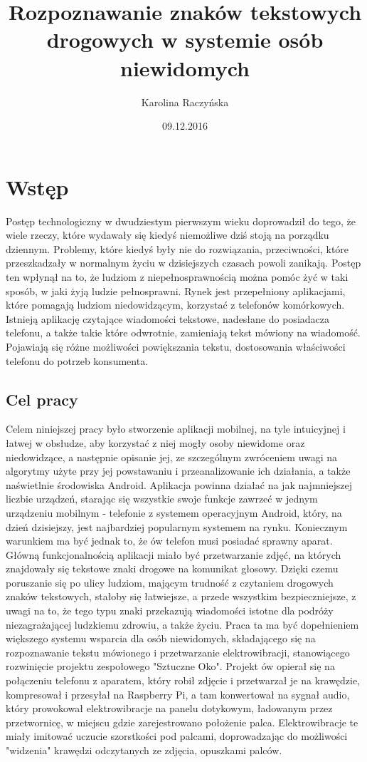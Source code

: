 \documentclass[eng,oneside]{mgr}
\title{Rozpoznawanie znaków tekstowych drogowych w systemie osób niewidomych}
\author{Karolina Raczyńska}
\date{09.12.2016}
\begin{document}
\maketitle
\tableofcontents 
\chapter{Wstęp}
Postęp technologiczny w dwudziestym pierwszym wieku doprowadził do tego, że wiele rzeczy, które wydawały się kiedyś niemożliwe dziś stoją na porządku dziennym. Problemy, które kiedyś były nie do rozwiązania, przeciwności, które przeszkadzały w normalnym życiu w dzisiejszych czasach powoli zanikają. Postęp ten wpłynął na to, że ludziom z niepełnosprawnością można pomóc żyć w taki sposób, w jaki żyją ludzie pełnosprawni. Rynek jest przepełniony aplikacjami, które pomagają ludziom niedowidzącym, korzystać z telefonów komórkowych. Istnieją aplikację czytające wiadomości tekstowe, nadesłane do posiadacza telefonu, a także takie które odwrotnie, zamieniają tekst mówiony na wiadomość. Pojawiają się różne możliwości powiększania tekstu, dostosowania właściwości telefonu do potrzeb konsumenta.
\section{Cel pracy}
Celem niniejszej pracy było stworzenie aplikacji mobilnej, na tyle intuicyjnej i łatwej w obsłudze, aby korzystać z niej mogły osoby niewidome oraz niedowidzące, a następnie opisanie jej, ze szczególnym zwróceniem uwagi na algorytmy użyte przy jej powstawaniu i przeanalizowanie ich działania, a także naświetlnie środowiska Android. Aplikacja powinna działać na jak najmniejszej liczbie urządzeń, starając się wszystkie swoje funkcje zawrzeć w jednym urządzeniu mobilnym - telefonie z systemem operacyjnym Android, który, na dzień dzisiejszy, jest najbardziej popularnym systemem na rynku. Koniecznym warunkiem ma być jednak to, że ów telefon musi posiadać sprawny aparat. Główną funkcjonalnością aplikacji miało być przetwarzanie zdjęć, na których znajdowały się tekstowe znaki drogowe na komunikat głosowy. Dzięki czemu poruszanie się po ulicy ludziom, mającym trudność z czytaniem drogowych znaków tekstowych, stałoby się łatwiejsze, a przede wszystkim bezpieczniejsze, z uwagi na to, że tego typu znaki przekazują wiadomości istotne dla podróży niezagrażającej ludzkiemu zdrowiu, a także życiu. Praca ta ma być dopełnieniem większego systemu wsparcia dla osób niewidomych, składającego się na rozpoznawanie tekstu mówionego i przetwarzanie elektrowibracji, stanowiącego rozwinięcie projektu zespołowego "Sztuczne Oko". Projekt ów opierał się na połączeniu telefonu z aparatem, który robił zdjęcie i przetwarzał je na krawędzie, kompresował i przesyłał na Raspberry Pi, a tam konwertował na sygnał audio, który prowokował elektrowibracje na panelu dotykowym, ładowanym przez przetwornicę, w miejscu gdzie zarejestrowano położenie palca. Elektrowibracje te miały imitować uczucie szorstkości pod palcami, doprowadzając do możliwości "widzenia" krawędzi odczytanych ze zdjęcia, opuszkami palców.
\end{document}
